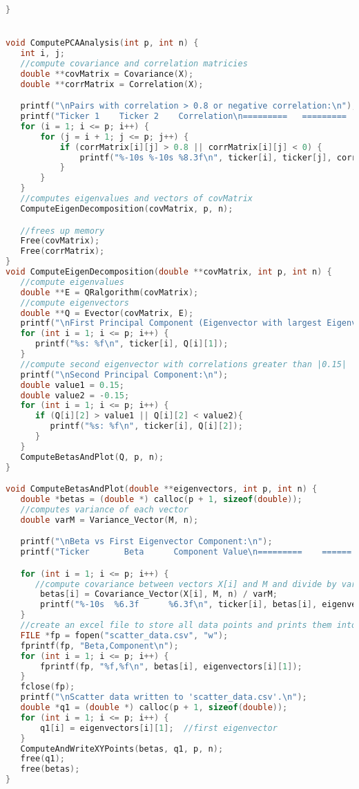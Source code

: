 \documentclass{report}
\begin{document}
\begin{lstlisting}[language=c++]
}


void ComputePCAAnalysis(int p, int n) {
   int i, j;
   //compute covariance and correlation matricies
   double **covMatrix = Covariance(X);
   double **corrMatrix = Correlation(X);

   printf("\nPairs with correlation > 0.8 or negative correlation:\n");
   printf("Ticker 1    Ticker 2    Correlation\n=========   =========   ============\n");
   for (i = 1; i <= p; i++) {
       for (j = i + 1; j <= p; j++) {
           if (corrMatrix[i][j] > 0.8 || corrMatrix[i][j] < 0) {
               printf("%-10s %-10s %8.3f\n", ticker[i], ticker[j], corrMatrix[i][j]);
           }
       }
   }
   //computes eigenvalues and vectors of covMatrix
   ComputeEigenDecomposition(covMatrix, p, n);

   //frees up memory
   Free(covMatrix);
   Free(corrMatrix);
}
void ComputeEigenDecomposition(double **covMatrix, int p, int n) {
   //compute eigenvalues
   double **E = QRalgorithm(covMatrix);
   //compute eigenvectors
   double **Q = Evector(covMatrix, E);      
   printf("\nFirst Principal Component (Eigenvector with largest Eigenvalue):\n");
   for (int i = 1; i <= p; i++) {
      printf("%s: %f\n", ticker[i], Q[i][1]);
   }  
   //compute second eigenvector with correlations greater than |0.15|
   printf("\nSecond Principal Component:\n");
   double value1 = 0.15;
   double value2 = -0.15;
   for (int i = 1; i <= p; i++) {
      if (Q[i][2] > value1 || Q[i][2] < value2){
         printf("%s: %f\n", ticker[i], Q[i][2]);
      }
   }
   ComputeBetasAndPlot(Q, p, n);
}

void ComputeBetasAndPlot(double **eigenvectors, int p, int n) {
   double *betas = (double *) calloc(p + 1, sizeof(double));
   //computes variance of each vector
   double varM = Variance_Vector(M, n);

   printf("\nBeta vs First Eigenvector Component:\n");
   printf("Ticker       Beta      Component Value\n=========    ======    ================\n");

   for (int i = 1; i <= p; i++) {
      //compute covariance between vectors X[i] and M and divide by variance of M
       betas[i] = Covariance_Vector(X[i], M, n) / varM;
       printf("%-10s  %6.3f      %6.3f\n", ticker[i], betas[i], eigenvectors[i][1]);
   }
   //create an excel file to store all data points and prints them into it
   FILE *fp = fopen("scatter_data.csv", "w");
   fprintf(fp, "Beta,Component\n");
   for (int i = 1; i <= p; i++) {
       fprintf(fp, "%f,%f\n", betas[i], eigenvectors[i][1]);
   }
   fclose(fp);
   printf("\nScatter data written to 'scatter_data.csv'.\n");
   double *q1 = (double *) calloc(p + 1, sizeof(double));
   for (int i = 1; i <= p; i++) {
       q1[i] = eigenvectors[i][1];  //first eigenvector
   }
   ComputeAndWriteXYPoints(betas, q1, p, n);
   free(q1);
   free(betas);
}


\end{lstlisting}
\end{document}
